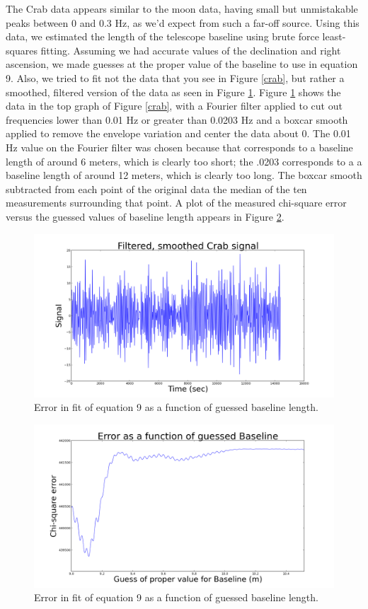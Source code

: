\documentclass[11pt]{article}
\begin{document}
The Crab data appears similar to the moon data, having small but unmistakable peaks between 0 and 0.3 Hz, as we'd expect from such a far-off source. Using this data, we estimated the length of the telescope baseline using brute force least-squares fitting. Assuming we had accurate values of the declination and right ascension, we made guesses at the proper value of the baseline to use in equation 9. Also, we tried to fit not the data that you see in Figure \ref{crab}, but rather a smoothed, filtered version of the data as seen in Figure \ref{crabsmooth}. Figure \ref{crabsmooth} shows the data in the top graph of Figure \ref{crab}, with a Fourier filter applied to cut out frequencies lower than 0.01 Hz or greater than 0.0203 Hz and a boxcar smooth applied to remove the envelope variation and center the data about 0. The 0.01 Hz value on the Fourier filter was chosen because that corresponds to a baseline length of around 6 meters, which is clearly too short; the .0203 corresponds to a a baseline length of around 12 meters, which is clearly too long. The boxcar smooth subtracted from each point of the original data the median of the ten measurements surrounding that point. A plot of the measured chi-square error versus the guessed values of baseline length appears in Figure \ref{crabchi}.

\begin{figure}
\centering
\includegraphics[scale=0.35]{garphs/crabsmooth}
\caption{ Error in fit of equation 9 as a function of guessed baseline length. \label{crabsmooth}}
\end{figure}

\begin{figure}
\centering
\includegraphics[scale=0.35]{garphs/crabchi}
\caption{ Error in fit of equation 9 as a function of guessed baseline length. \label{crabchi}}
\end{figure}
\end{document}
